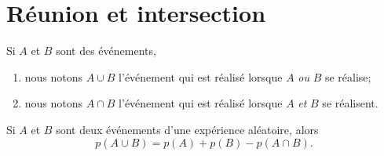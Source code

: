 \section{Réunion et intersection}


Si \( A\) et \( B\) sont des événements, 
\begin{enumerate}
    \item
nous notons \( A\cup B\) l'événement qui est réalisé lorsque \( A\) \emph{ou} \( B\) se réalise;
\item
nous notons \( A\cap B\) l'événement qui est réalisé lorsque \( A\) \emph{et} \( B\) se réalisent.
\end{enumerate}

\begin{Aretenir}
    Si \( A\) et \( B\) sont deux événements d'une expérience aléatoire, alors
    \begin{equation}
        p(A\cup B)=p(A)+p(B)-p(A\cap B).
    \end{equation}
\end{Aretenir}


